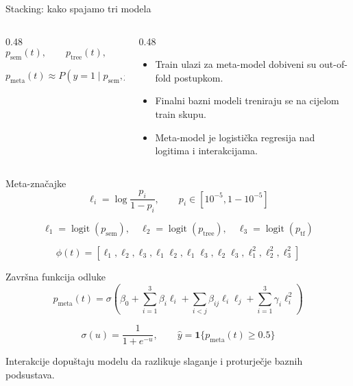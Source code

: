 \documentclass[aspectratio=169]{beamer}
\begin{document}
\begin{frame}{Stacking: kako spajamo tri modela}
    \begin{columns}[T]
        \begin{column}{0.48\textwidth}
            \[
                p_{\mathrm{sem}}(t),\qquad p_{\mathrm{tree}}(t),\qquad p_{\mathrm{tf}}(t)
            \]

            \[
                p_{\mathrm{meta}}(t)\approx P(y=1\mid p_{\mathrm{sem}},p_{\mathrm{tree}},p_{\mathrm{tf}})
            \]
        \end{column}
        \begin{column}{0.48\textwidth}
            \small
            \begin{itemize}
                \item Train ulazi za meta-model dobiveni su out-of-fold postupkom.
                \item Finalni bazni modeli treniraju se na cijelom train skupu.
                \item Meta-model je logistička regresija nad logitima i interakcijama.
            \end{itemize}
        \end{column}
    \end{columns}
\end{frame}

\begin{frame}{Meta-značajke}
    \[
        \ell_i=\log\frac{p_i}{1-p_i}, \qquad p_i\in[10^{-5},1-10^{-5}]
    \]

    \[
        \ell_1=\operatorname{logit}(p_{\mathrm{sem}}),\quad
        \ell_2=\operatorname{logit}(p_{\mathrm{tree}}),\quad
        \ell_3=\operatorname{logit}(p_{\mathrm{tf}})
    \]

    \[
        \phi(t)=\left[\ell_1,\ell_2,\ell_3,\ell_1\ell_2,\ell_1\ell_3,\ell_2\ell_3,\ell_1^2,\ell_2^2,\ell_3^2\right]
    \]
\end{frame}

\begin{frame}{Završna funkcija odluke}
    \[
        p_{\mathrm{meta}}(t)=\sigma\left(\beta_0+\sum_{i=1}^{3}\beta_i\ell_i+\sum_{i<j}\beta_{ij}\ell_i\ell_j+\sum_{i=1}^{3}\gamma_i\ell_i^2\right)
    \]

    \[
        \sigma(u)=\frac{1}{1+e^{-u}}, \qquad
        \hat y=\mathbf{1}\{p_{\mathrm{meta}}(t)\ge 0.5\}
    \]

    \vspace{2mm}
    \centering
    {\small Interakcije dopuštaju modelu da razlikuje slaganje i proturječje baznih podsustava.}
\end{frame}
\end{document}
